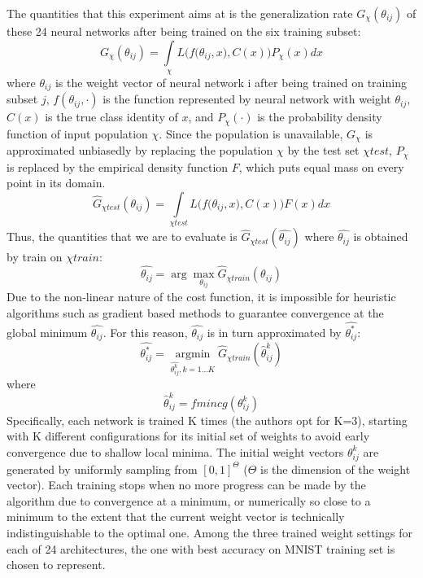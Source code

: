 \documentclass[conference]{IEEEtran}
\begin{document}
The quantities that this experiment aims at is the generalization rate \({G_χ}({\theta _{ij}})\) of these 24 neural networks after being trained on the six training subset:
\[{G_ \chi }({\theta _{ij}}) = \int\limits_ \chi  {L(f(} {\theta _{ij}},x ),C(x)){P_\chi }(x)dx\]
where \({\theta _{ij}}\) is the weight vector of neural network i after being trained on training subset $j$, \(f({\theta _{ij}}, \cdot )\) is the function represented by neural network with weight \({\theta _{ij}}\), $C(x)$ is the true class identity of $x$, and \({P_\chi}( \cdot )\) is the probability density function of input population $\chi$. Since the population is unavailable, \({G_\chi }\) is approximated unbiasedly by replacing the population $\chi$ by the test set \(\chi test\), \({P_\chi }\) is replaced by the empirical density function $F$, which puts equal mass on every point in its domain. 
\[{\widehat G_{\chi test}}({\theta _{ij}}) = \int\limits_{\chi test} {L(f(} {\theta _{ij}},x),C(x))F(x)dx\]
Thus, the quantities that we are to evaluate is  \({\widehat G_{\chi test}}(\widehat {{\theta _{ij}}})\) where \(\widehat {{\theta _{ij}}}\) is obtained by train on \(\chi train\):
\[\widehat {{\theta _{ij}}} = \arg {\max _{{\theta _{ij}}}}{\widehat G_{\chi train}}({\theta _{ij}})\]
Due to the non-linear nature of the cost function, it is impossible for heuristic algorithms such as gradient based methods to guarantee convergence at the global minimum \(\widehat {{\theta _{ij}}}\). For this reason, 
\(\widehat {{\theta _{ij}}}\) is in turn approximated by \(\widehat {\theta _{ij}^*}\):
\[\widehat {\theta _{ij}^*} = \mathop {\arg \min }\limits_{\widehat {\theta _{ij}^k},k = 1...K} {{\hat G}_{\chi train}}(\hat \theta _{ij}^k)\]
where
\[\widehat \theta _{ij}^k = fmincg(\theta _{ij}^k)\]
Specifically, each network is trained K times (the authors opt for K=3), starting with K different configurations for its initial set of weights to avoid early convergence due to shallow local minima. The initial weight vectors \(\theta _{ij}^k\) are generated by uniformly sampling from \({[0,1]^\Theta }\) (\(\Theta \) is the dimension of the weight vector). Each training stops when no more progress can be made by the algorithm due to convergence at a minimum, or numerically so close to a minimum to the extent that the current weight vector is technically indistinguishable to the optimal one. Among the three trained weight settings for each of 24 architectures, the one with best accuracy on MNIST training set is chosen to represent.
\end{document}

